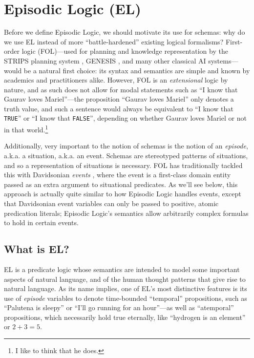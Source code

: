 \section{Episodic Logic (EL)}
\label{sec:el}

Before we define Episodic Logic, we should motivate its use for schemas: why do we use EL instead of more ``battle-hardened'' existing logical formalisms? First-order logic (FOL)---used for planning and knowledge representation by the STRIPS planning system \citep{fikes1972}, GENESIS \citep{mooney90}, and many other classical AI systems---would be a natural first choice: its syntax and semantics are simple and known by academics and practitioners alike. However, FOL is an \textit{extensional} logic by nature, and as such does not allow for modal statements such as ``I know that Gaurav loves Mariel''---the proposition ``Gaurav loves Mariel'' only denotes a truth value, and such a sentence would always be equivalent to ``I know that \texttt{TRUE}'' or ``I know that \texttt{FALSE}'', depending on whether Gaurav loves Mariel or not in that world.\footnote{I like to think that he does.}

Additionally, very important to the notion of schemas is the notion of an \textit{episode}, a.k.a. a situation, a.k.a. an event. Schemas are stereotyped patterns of situations, and so a representation of situations is necessary. FOL has traditionally tackled this with Davidsonian \textit{events} \citep{Davidson1967}, where the event is a first-class domain entity passed as an extra argument to situational predicates. As we'll see below, this approach is actually quite similar to how Episodic Logic handles events, except that Davidsonian event variables can only be passed to positive, atomic predication literals; Episodic Logic's semantics allow arbitrarily complex formulas to hold in certain events.

\subsection{What is EL?}
EL is a predicate logic whose semantics are intended to model some important aspects of natural language, and of the human thought patterns that give rise to natural language. As its name implies, one of EL's most distinctive features is its use of \textit{episode} variables to denote time-bounded ``temporal'' propositions, such as ``Palutena is sleepy'' or ``I'll go running for an hour''---as well as ``atemporal'' propositions, which necessarily hold true eternally, like ``hydrogen is an element'' or $2+3=5$.

